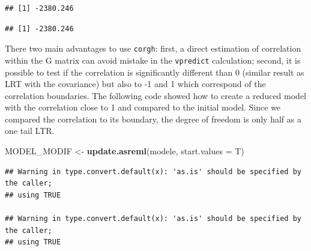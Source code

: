 \documentclass[
  12pt,
]{book}
\newenvironment{Shaded}{\begin{snugshade}}{\end{snugshade}}
\newcommand{\DataTypeTok}[1]{\textcolor[rgb]{0.13,0.29,0.53}{#1}}
\newcommand{\KeywordTok}[1]{\textcolor[rgb]{0.13,0.29,0.53}{\textbf{#1}}}
\newcommand{\NormalTok}[1]{#1}
\newcommand{\OperatorTok}[1]{\textcolor[rgb]{0.81,0.36,0.00}{\textbf{#1}}}
\newcommand{\StringTok}[1]{\textcolor[rgb]{0.31,0.60,0.02}{#1}}
\begin{document}
\begin{verbatim}
## [1] -2380.246
\end{verbatim}

\begin{Shaded}
\end{Shaded}

\begin{verbatim}
## [1] -2380.246
\end{verbatim}

There two main advantages to use \texttt{corgh}: first, a direct estimation of correlation within the G matrix can avoid mistake in the \texttt{vpredict} calculation; second, it is possible to test if the correlation is significantly different than 0 (similar result as LRT with the covariance) but also to -1 and 1 which correspond of the correlation boundaries.
The following code showed how to create a reduced model with the correlation close to 1 and compared to the initial model.
Since we compared the correlation to its boundary, the degree of freedom is only half as a one tail LTR.

\begin{Shaded}
\begin{Highlighting}[]
\NormalTok{MODEL\_MODIF \textless{}{-}}\StringTok{ }\KeywordTok{update.asreml}\NormalTok{(modele, }\DataTypeTok{start.values =}\NormalTok{ T)}
\end{Highlighting}
\end{Shaded}

\begin{verbatim}
## Warning in type.convert.default(x): 'as.is' should be specified by the caller;
## using TRUE

## Warning in type.convert.default(x): 'as.is' should be specified by the caller;
## using TRUE
\end{verbatim}
\end{document}
